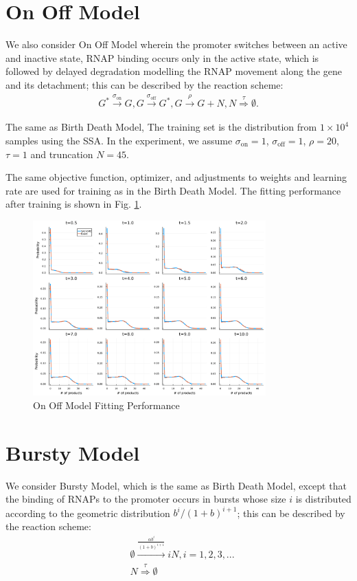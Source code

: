 \documentclass[a4paper,10pt]{article}
\begin{document}
\section{On Off Model}
We also consider On Off Model wherein the promoter switches between an active and inactive state, RNAP binding occurs only in the active state, which is followed by delayed degradation modelling the RNAP movement along the gene and its detachment; this can be described by the reaction scheme:
\begin{equation}\label{on-off}
	\begin{aligned}
	G^*\xrightarrow{\sigma_{\text{on}}} G,
	G\xrightarrow{\sigma_{\text{off}}}G^*,
	G\xrightarrow{\rho}G+N,
	N\stackrel{\tau}\Rightarrow\emptyset.
	\end{aligned}
\end{equation}

The same as Birth Death Model, The training set is the distribution from $1 \times 10^4$ samples using the SSA. In the experiment, we assume $\sigma_{\text{on}}=1$, $\sigma_{\text{off}}=1$, $\rho=20$, $\tau=1$ and truncation $N=45$.

The same objective function, optimizer, and adjustments to weights and learning rate are used for training as in the Birth Death Model. The fitting performance after training is shown in Fig. \ref{On Off Model fitting}. 
\begin{figure}[h]
	\centering
	\includegraphics[width=0.8\textwidth]{Figs/On_Off_fitting.pdf}
	\caption{On Off Model Fitting Performance}\label{On Off Model fitting}  
\end{figure}
\newpage

\section{Bursty Model}
We consider Bursty Model, which is the same as Birth Death Model, except that the binding of RNAPs to the promoter occurs in bursts whose size $i$ is distributed according to the geometric distribution $b^i/(1 + b)^{i+1}$; this can be described by the reaction scheme:
\begin{equation}\label{bursty}
	\begin{aligned}
		&\emptyset\stackrel{\frac{\alpha b^i}{(1+b)^{i+1}}}\longrightarrow iN,i=1,2,3,...\\ &N\stackrel{\tau}\Rightarrow\emptyset
	\end{aligned}
\end{equation}
\end{document}
